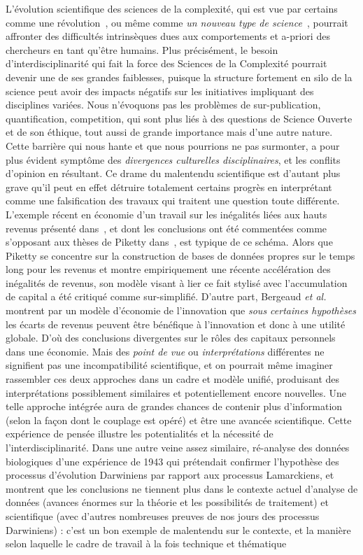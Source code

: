 {}{
L'évolution scientifique des sciences de la complexité, qui est vue par certains comme une révolution~\cite{colander2003complexity}, ou même comme \emph{un nouveau type de science}~\cite{wolfram2002new}, pourrait affronter des difficultés intrinsèques dues aux comportements et a-priori des chercheurs en tant qu'être humains. Plus précisément, le besoin d'interdisciplinarité qui fait la force des Sciences de la Complexité pourrait devenir une de ses grandes faiblesses, puisque la structure fortement en silo de la science peut avoir des impacts négatifs sur les initiatives impliquant des disciplines variées. Nous n'évoquons pas les problèmes de sur-publication, quantification, competition, qui sont plus liés à des questions de Science Ouverte et de son éthique, tout aussi de grande importance mais d'une autre nature. Cette barrière qui nous hante et que nous pourrions ne pas surmonter, a pour plus évident symptôme des \emph{divergences culturelles disciplinaires}, et les conflits d'opinion en résultant. Ce drame du malentendu scientifique est d'autant plus grave qu'il peut en effet détruire totalement certains progrès en interprétant comme une falsification des travaux qui traitent une question toute différente. L'exemple récent en économie d'un travail sur les inégalités liées aux hauts revenus présenté dans~\cite{aghion2015innovation}, et dont les conclusions ont été commentées comme s'opposant aux thèses de Piketty dans~\cite{piketty2013capital}, est typique de ce schéma. Alors que Piketty se concentre sur la construction de bases de données propres sur le temps long pour les revenus et montre empiriquement une récente accélération des inégalités de revenus, son modèle visant à lier ce fait stylisé avec l'accumulation de capital a été critiqué comme sur-simplifié. D'autre part, Bergeaud \textit{et al.} montrent par un modèle d'économie de l'innovation que \emph{sous certaines hypothèses} les écarts de revenus peuvent être bénéfique à l'innovation et donc à une utilité globale. D'où des conclusions divergentes sur le rôles des capitaux personnels dans une économie. Mais des \emph{point de vue} ou \emph{interprétations} différentes ne signifient pas une incompatibilité scientifique, et on pourrait même imaginer rassembler ces deux approches dans un cadre et modèle unifié, produisant des interprétations possiblement similaires et potentiellement encore nouvelles. Une telle approche intégrée aura de grandes chances de contenir plus d'information (selon la façon dont le couplage est opéré) et être une avancée scientifique. Cette expérience de pensée illustre les potentialités et la nécessité de l'interdisciplinarité. Dans une autre veine assez similaire, \cite{2017arXiv170105627H} ré-analyse des données biologiques d'une expérience de 1943 qui prétendait confirmer l'hypothèse des processus d'évolution Darwiniens par rapport aux processus Lamarckiens, et montrent que les conclusions ne tiennent plus dans le contexte actuel d'analyse de données (avances énormes sur la théorie et les possibilités de traitement) et scientifique (avec d'autres nombreuses preuves de nos jours des processus Darwiniens) : c'est un bon exemple de malentendu sur le contexte, et la manière selon laquelle le cadre de travail à la fois technique et thématique }
